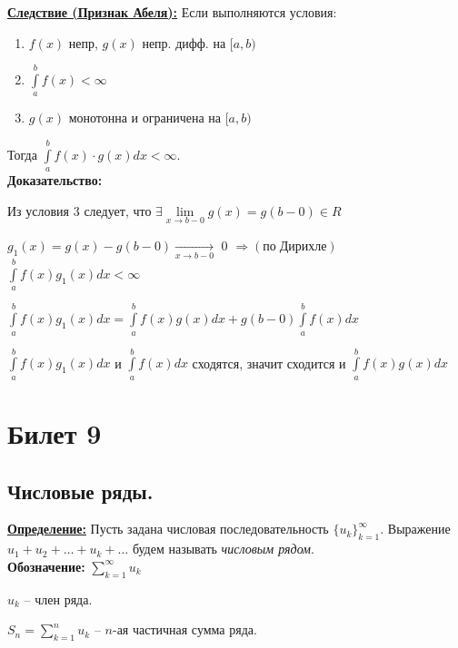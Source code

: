 \documentclass[a4paper,12pt]{article} %
\newcommand{\useries}{\sum\limits_{k=1}^{\infty} u_k}
\newcommand{\sn}{\sum\limits_{k=1}^{n} u_k}
\begin{document}
\underline{\textbf{Следствие (Признак Абеля):}} Если выполняются условия:

\begin{enumerate}
    \item $f(x)$ непр, $g(x)$ непр. дифф. на $[a, b)$
    
    \item $\int\limits_{a}^{b}f(x) < \infty$
    
    \item $g(x)$ монотонна и ограничена на $[a, b)$ 

\end{enumerate}

Тогда $\int\limits_a^b f(x)\cdot g(x) dx < \infty$.\\

\textbf{Доказательство:}

Из условия $3$ следует, что $\exists\lim\limits_{x\rightarrow b-0}g(x) = g(b-0) \in R$

$g_1(x) = g(x) - g(b-0) \xrightarrow[x \to b-0]{}$ 0 $\Rightarrow(по\; Дирихле)$ $\int\limits_a^b f(x)g_1(x) dx < \infty$

$\int\limits_a^b f(x)g_1(x)dx = \int\limits_a^b f(x)g(x)dx+g(b-0)\int\limits_a^b f(x)dx$

$\int\limits_a^b f(x)g_1(x)dx$ и $\int\limits_a^b f(x)dx$ сходятся, значит сходится и $\int\limits_a^b f(x)g(x)dx$



\newpage
\section{Билет 9}

\subsection{Числовые ряды.}

\underline{\textbf{Определение:}}
Пусть задана числовая последовательность $\{{u_k}\}_{k=1}^{\infty}$. Выражение $u_1 + u_2 + \ldots + u_k + \ldots$ будем называть \textit{числовым рядом}.\\

\textbf{Обозначение:} $\useries$

$u_k$ -- член ряда.

$S_n = \sn$ -- $n$-ая частичная сумма ряда.\\
\end{document}

